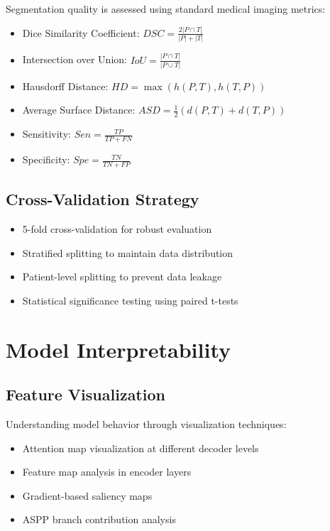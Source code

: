 Segmentation quality is assessed using standard medical imaging metrics:

\begin{itemize}
\item Dice Similarity Coefficient: $DSC = \frac{2|P \cap T|}{|P| + |T|}$
\item Intersection over Union: $IoU = \frac{|P \cap T|}{|P \cup T|}$
\item Hausdorff Distance: $HD = \max(h(P,T), h(T,P))$
\item Average Surface Distance: $ASD = \frac{1}{2}(d(P,T) + d(T,P))$
\item Sensitivity: $Sen = \frac{TP}{TP + FN}$
\item Specificity: $Spe = \frac{TN}{TN + FP}$
\end{itemize}

\subsection{Cross-Validation Strategy}

\begin{itemize}
\item 5-fold cross-validation for robust evaluation
\item Stratified splitting to maintain data distribution
\item Patient-level splitting to prevent data leakage
\item Statistical significance testing using paired t-tests
\end{itemize}

\section{Model Interpretability}

\subsection{Feature Visualization}

Understanding model behavior through visualization techniques:
\begin{itemize}
\item Attention map visualization at different decoder levels
\item Feature map analysis in encoder layers
\item Gradient-based saliency maps
\item ASPP branch contribution analysis
\end{itemize}

